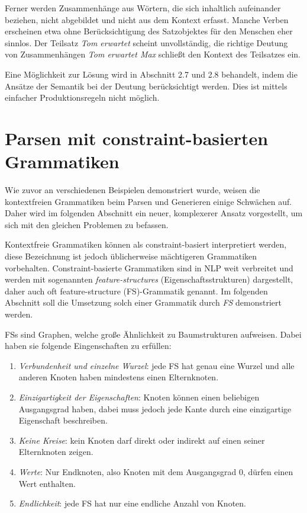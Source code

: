 \documentclass[12pt]{report}
\begin{document}
Ferner werden Zusammenhänge aus Wörtern, die sich inhaltlich aufeinander beziehen, nicht abgebildet und nicht aus dem Kontext erfasst. Manche Verben erscheinen etwa ohne Berücksichtigung des Satzobjektes für den Menschen eher sinnlos. Der Teilsatz \textit{\glqq  Tom erwartet\grqq{}} scheint unvollständig, die richtige Deutung von Zusammenhängen \textit{\glqq  Tom erwartet Max\grqq{}} schließt den Kontext des Teilsatzes ein.

Eine Möglichkeit zur Lösung wird in Abschnitt 2.7 und 2.8 behandelt, indem die Ansätze der Semantik bei der Deutung berücksichtigt werden. Dies ist mittels einfacher Produktionsregeln nicht möglich.

\section[Parsen mit CBGs]{Parsen mit constraint-basierten \\Grammatiken}
Wie zuvor an verschiedenen Beispielen demonstriert wurde, weisen die kontextfreien Grammatiken beim Parsen und Generieren einige Schwächen auf. Daher wird im folgenden Abschnitt ein neuer, komplexerer Ansatz vorgestellt, um sich mit den gleichen Problemen zu befassen. 

Kontextfreie Grammatiken können als constraint-basiert interpretiert werden, diese Bezeichnung ist jedoch üblicherweise mächtigeren Grammatiken vorbehalten. Constraint-basierte Grammatiken sind in NLP weit verbreitet und werden mit sogenannten \textit{feature-structures} (Eigenschaftsstrukturen) dargestellt, daher auch oft feature-structure (FS)-Grammatik genannt. Im folgenden Abschnitt soll die Umsetzung solch einer Grammatik durch \textit{FS} demonstriert werden.

FSs sind Graphen, welche große Ähnlichkeit zu Baumstrukturen aufweisen. Dabei haben sie folgende Eingenschaften zu erfüllen:

\begin{enumerate}
\item \textit{Verbundenheit und einzelne Wurzel}: jede FS hat genau eine Wurzel und alle anderen Knoten haben mindestens einen Elternknoten.
\item \textit{Einzigartigkeit der Eigenschaften}: Knoten können einen beliebigen Ausgangsgrad haben, dabei muss jedoch jede Kante durch eine einzigartige Eigenschaft beschreiben.
\item \textit{Keine Kreise}: kein Knoten darf direkt oder indirekt auf einen seiner Elternknoten zeigen. 
\item \textit{Werte}: Nur Endknoten, also Knoten mit dem Ausgangsgrad 0, dürfen einen Wert enthalten. 
\item \textit{Endlichkeit}: jede FS hat nur eine endliche Anzahl von Knoten.
\end{enumerate}
\end{document}
